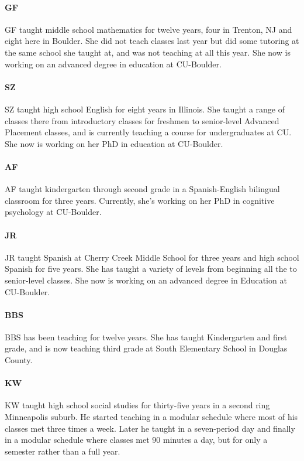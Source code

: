 \paragraph{GF} GF taught middle school mathematics for twelve years, four in Trenton, NJ
and eight here in Boulder.  She did not teach classes last year but did some
tutoring at the same school she taught at, and was not teaching at all this
year. She now is working on an advanced degree in education at CU-Boulder.

\paragraph{SZ} SZ taught high school English for eight years in Illinois.  She
taught a range of classes there from introductory classes for freshmen to
senior-level Advanced Placement classes, and is currently teaching a course for
undergraduates at CU.  She now is working on her PhD in education at CU-Boulder.

\paragraph{AF} AF taught kindergarten through second grade in a Spanish-English
bilingual classroom for three years.  Currently, she's working on her PhD in
cognitive psychology at CU-Boulder.

\paragraph{JR} JR taught Spanish at Cherry Creek Middle School for three years
and high school Spanish for five years. She has taught a variety of levels from
beginning all the to senior-level classes. She now is working on an advanced
degree in Education at CU-Boulder.

\paragraph{BBS} BBS has been teaching for twelve years. She has taught Kindergarten
and first grade, and is now teaching third grade at South Elementary
School in Douglas County.

\paragraph{KW} KW taught high school social studies for thirty-five years in a second
ring Minneapolis suburb. He started teaching in a modular schedule where most of
his classes met three times a week. Later he taught in a seven-period day and finally in
a modular schedule where classes met 90 minutes a day, but for only a semester
rather than a full year.

